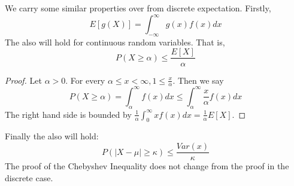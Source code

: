\documentclass{article}
\theoremstyle{definition}
\begin{document}
    We carry some similar properties over from discrete expectation. Firstly,
    \[
        E[g(X)] = \int_{-\infty}^\infty g(x)f(x) dx    
    \]
    The  also will hold for continuous random variables. That is,
    \[
        P(X \geq \alpha) \leq \frac{E[X]}{\alpha}    
    \]
    \begin{proof}
        Let $\alpha > 0$. For every $\alpha \leq x < \infty, 1 \leq \frac{x}{\alpha}$. Then we say 
        \[
            P(X \geq \alpha) = \int_\alpha^\infty f(x) dx \leq \int_\alpha^\infty \frac{x}{\alpha}f(x)dx
        \]
        The right hand side is bounded by $\frac{1}{\alpha} \int_0^\infty x f(x) dx = \frac{1}{\alpha} E[X]$.
    \end{proof}
    Finally the  also will hold:
    \[
        P(|X - \mu| \geq \kappa) \leq \frac{Var(x)}{\kappa}
    \]
    The proof of the Chebyshev Inequality does not change from the proof in the discrete case.
\end{document}
